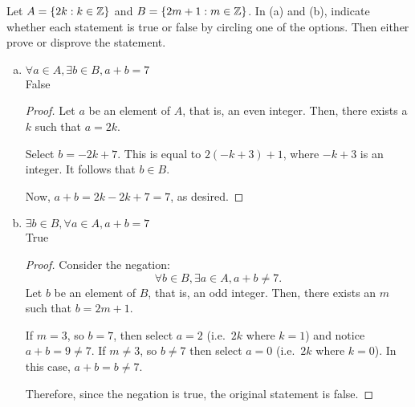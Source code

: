 \documentclass{agony}
\begin{document}
\question Let $A = \{2k : k\in\mathbb{Z}\}$ and $B = \{2m + 1 : m\in\mathbb{Z}\}$.
In (a) and (b), indicate whether each statement is true or false by circling one of the options.
Then either prove or disprove the statement.
\begin{enumerate}[(a)]
  \item $\forall a \in A, \exists b \in B, a + b = 7$ \\
         \quad False
        \begin{proof}
          Let $a$ be an element of $A$, that is, an even integer.
          Then, there exists a $k$ such that $a=2k$.

          Select $b = -2k + 7$.
          This is equal to $2(-k+3)+1$, where $-k+3$ is an integer.
          It follows that $b \in B$.

          Now, $a + b = 2k - 2k + 7 = 7$, as desired.
        \end{proof}
  \item $\exists b \in B, \forall a \in A, a + b = 7$ \\
        True \quad {}
        \begin{proof}
          Consider the negation:
          \[ \forall b \in B, \exists a \in A, a + b \neq 7. \]
          Let $b$ be an element of $B$, that is, an odd integer.
          Then, there exists an $m$ such that $b=2m+1$.

          If $m=3$, so $b=7$, then select $a=2$ (i.e.\ $2k$ where $k=1$) and notice $a+b=9 \neq 7$.
          If $m\neq 3$, so $b\neq 7$ then select $a=0$ (i.e.\ $2k$ where $k=0$).
          In this case, $a+b = b \neq 7$.

          Therefore, since the negation is true, the original statement is false.
        \end{proof}
\end{enumerate}
\end{document}
